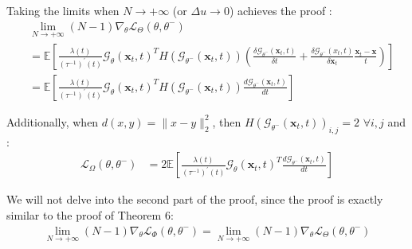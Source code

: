 \noindent Taking the limits when $N \rightarrow + \infty$ (or $\Delta u \rightarrow 0$) achieves the proof :
\begin{align}
    & \lim_{N \rightarrow + \infty} (N - 1)\nabla_{\theta}\mathcal{L}_{\Theta}(\theta, \theta^{-}) \\
    & = \mathbb{E} \left[ \frac{\lambda(t)}{(\tau^{-1})^{'}(t)}\mathcal{G}_{\theta}(\mathbf{x}_t, t)^T H(\mathcal{G}_{\theta^{-}}(\mathbf{x}_t, t)) \left(\frac{\delta \mathcal{G}_{\theta^{-}}(\mathbf{x}_t, t)}{\delta t} + \frac{\delta \mathcal{G}_{\theta^{-}}(x_t, t)}{\delta \mathbf{x}_t} \frac{\mathbf{x}_t - \mathbf{x}}{t} \right)\right] \\
    & = \mathbb{E} \left[ \frac{\lambda(t)}{(\tau^{-1})^{'}(t)}\mathcal{G}_{\theta}(\mathbf{x}_t, t)^T H(\mathcal{G}_{\theta^{-}}(\mathbf{x}_t, t)) \frac{d \mathcal{G}_{\theta^{-}}(\mathbf{x}_t, t)}{dt}\right]    
\end{align}

\noindent Additionally, when $d (x,y) = \lVert x - y\rVert_2^2$, then $H(\mathcal{G}_{\theta^{-}}(\mathbf{x}_t, t))_{i, j} = 2$ $\forall i, j$ and :
\begin{align}
    \mathcal{L}_{\Omega}(\theta, \theta^{-}) & = 2\mathbb{E} \left[ \frac{\lambda(t)}{(\tau^{-1})^{'}(t)}\mathcal{G}_{\theta}(\mathbf{x}_t, t)^T \frac{d \mathcal{G}_{\theta^{-}}(\mathbf{x}_t, t)}{dt} \right]
\end{align}



\noindent We will not delve into the second part of the proof, since the proof is exactly similar to the proof of Theorem 6:
\begin{align}
 \lim_{N \rightarrow + \infty} (N - 1)\nabla_{\theta}\mathcal{L}_{\Phi}(\theta, \theta^{-}) = \lim_{N \rightarrow + \infty} (N - 1)\nabla_{\theta}\mathcal{L}_{\Theta}(\theta, \theta^{-})    
\end{align}

